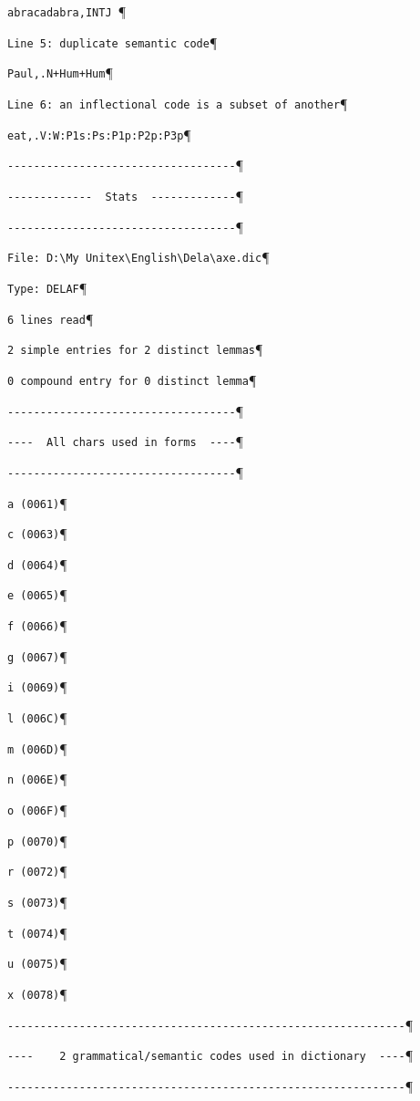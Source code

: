 \verb$abracadabra,INTJ $\P

\verb$Line 5: duplicate semantic code$\P

\verb$Paul,.N+Hum+Hum$\P

\verb$Line 6: an inflectional code is a subset of another$\P

\verb$eat,.V:W:P1s:Ps:P1p:P2p:P3p$\P

\verb$-----------------------------------$\P

\verb$-------------  Stats  -------------$\P

\verb$-----------------------------------$\P

\verb$File: D:\My Unitex\English\Dela\axe.dic$\P

\verb$Type: DELAF$\P

\verb$6 lines read$\P

\verb$2 simple entries for 2 distinct lemmas$\P

\verb$0 compound entry for 0 distinct lemma$\P

\verb$-----------------------------------$\P

\verb$----  All chars used in forms  ----$\P

\verb$-----------------------------------$\P

\verb$a (0061)$\P

\verb$c (0063)$\P

\verb$d (0064)$\P

\verb$e (0065)$\P

\verb$f (0066)$\P

\verb$g (0067)$\P

\verb$i (0069)$\P

\verb$l (006C)$\P

\verb$m (006D)$\P

\verb$n (006E)$\P

\verb$o (006F)$\P

\verb$p (0070)$\P

\verb$r (0072)$\P

\verb$s (0073)$\P

\verb$t (0074)$\P

\verb$u (0075)$\P

\verb$x (0078)$\P

\verb$-------------------------------------------------------------$\P

\verb$----    2 grammatical/semantic codes used in dictionary  ----$\P

\verb$-------------------------------------------------------------$\P

